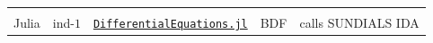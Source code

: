 \documentclass[]{book}
\theoremstyle{definition}
\theoremstyle{definition}
\theoremstyle{definition}
\theoremstyle{definition}
\theoremstyle{remark}
\begin{document}
\begin{longtable}[]{@{}lllll@{}}
\begin{minipage}[t]{0.40\columnwidth}
\end{minipage}\tabularnewline
\begin{minipage}[t]{0.05\columnwidth}\raggedright
Julia\strut
\end{minipage} & \begin{minipage}[t]{0.05\columnwidth}\raggedright
ind-\(1\)\strut
\end{minipage} & \begin{minipage}[t]{0.30\columnwidth}\raggedright
\href{https://docs.juliadiffeq.org/latest/index.html}{\texttt{DifferentialEquations.jl}}\strut
\end{minipage} & \begin{minipage}[t]{0.05\columnwidth}\raggedright
BDF\strut
\end{minipage} & \begin{minipage}[t]{0.40\columnwidth}\raggedright
calls SUNDIALS IDA\strut
\end{minipage}\tabularnewline
\bottomrule
\end{longtable}


\end{document}
